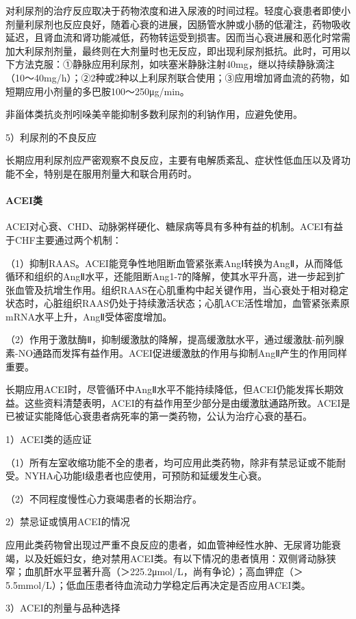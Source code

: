 对利尿剂的治疗反应取决于药物浓度和进入尿液的时间过程。轻度心衰患者即使小剂量利尿剂也反应良好，随着心衰的进展，因肠管水肿或小肠的低灌注，药物吸收延迟，且肾血流和肾功能减低，药物转运受到损害。因而当心衰进展和恶化时常需加大利尿剂剂量，最终则在大剂量时也无反应，即出现利尿剂抵抗。此时，可用以下方法克服：①静脉应用利尿剂，如呋塞米静脉注射40mg，继以持续静脉滴注（10～40mg/h）；②2种或2种以上利尿剂联合使用；③应用增加肾血流的药物，如短期应用小剂量的多巴胺100～250μg/min。

非甾体类抗炎剂吲哚美辛能抑制多数利尿剂的利钠作用，应避免使用。

5）利尿剂的不良反应

长期应用利尿剂应严密观察不良反应，主要有电解质紊乱、症状性低血压以及肾功能不全，特别是在服用剂量大和联合用药时。
\paragraph{ACEI类}

ACEI对心衰、CHD、动脉粥样硬化、糖尿病等具有多种有益的机制。ACEI有益于CHF主要通过两个机制：

（1）抑制RAAS。ACEI能竞争性地阻断血管紧张素AngⅠ转换为AngⅡ，从而降低循环和组织的AngⅡ水平，还能阻断Ang1-7的降解，使其水平升高，进一步起到扩张血管及抗增生作用。组织RAAS在心肌重构中起关键作用，当心衰处于相对稳定状态时，心脏组织RAAS仍处于持续激活状态；心肌ACE活性增加，血管紧张素原mRNA水平上升，AngⅡ受体密度增加。

（2）作用于激肽酶Ⅱ，抑制缓激肽的降解，提高缓激肽水平，通过缓激肽-前列腺素-NO通路而发挥有益作用。ACEI促进缓激肽的作用与抑制AngⅡ产生的作用同样重要。

长期应用ACEI时，尽管循环中AngⅡ水平不能持续降低，但ACEI仍能发挥长期效益。这些资料清楚表明，ACEI的有益作用至少部分是由缓激肽通路所致。ACEI是已被证实能降低心衰患者病死率的第一类药物，公认为治疗心衰的基石。

1）ACEI类的适应证

（1）所有左室收缩功能不全的患者，均可应用此类药物，除非有禁忌证或不能耐受。NYHA心功能Ⅰ级患者也应使用，可预防和延缓发生心衰。

（2）不同程度慢性心力衰竭患者的长期治疗。

2）禁忌证或慎用ACEI的情况

应用此类药物曾出现过严重不良反应的患者，如血管神经性水肿、无尿肾功能衰竭，以及妊娠妇女，绝对禁用ACEI类。有以下情况的患者慎用：双侧肾动脉狭窄；血肌酐水平显著升高（＞225.2μmol/L，尚有争论）；高血钾症（＞5.5mmol/L）；低血压患者待血流动力学稳定后再决定是否应用ACEI类。

3）ACEI的剂量与品种选择

